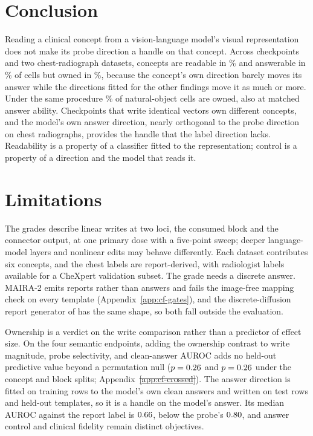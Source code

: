 \documentclass{article}
\makeatletter
\providecommand{\DIFaddtex}[1]{{\protect\color{blue}\uwave{#1}}} %
\providecommand{\DIFdeltex}[1]{{\protect\color{red}\sout{#1}}} %
\providecommand{\DIFaddbegin}{} %
\providecommand{\DIFaddend}{} %
\providecommand{\DIFdelbegin}{} %
\providecommand{\DIFdelend}{} %
\providecommand{\DIFadd}[1]{\texorpdfstring{\DIFaddtex{#1}}{#1}} %
\providecommand{\DIFdel}[1]{\texorpdfstring{\DIFdeltex{#1}}{}} %
\providecommand{\DIFscaledelfig}{0.5}
\newlength{\DIFdelgraphicswidth} %
\newlength{\DIFdelgraphicsheight} %
\providecommand{\DIFaddincludegraphics}[2][]{{\color{blue}\fbox{\DIFOincludegraphics[#1]{#2}}}} %
\providecommand{\DIFdelincludegraphics}[2][]{%
\sbox{\DIFdelgraphicsbox}{\DIFOincludegraphics[#1]{#2}}%
\settoboxwidth{\DIFdelgraphicswidth}{\DIFdelgraphicsbox} %
\settoboxtotalheight{\DIFdelgraphicsheight}{\DIFdelgraphicsbox} %
\scalebox{\DIFscaledelfig}{%
\parbox[b]{\DIFdelgraphicswidth}{\usebox{\DIFdelgraphicsbox}\\[-\baselineskip] \rule{\DIFdelgraphicswidth}{0em}}\llap{\resizebox{\DIFdelgraphicswidth}{\DIFdelgraphicsheight}{%
\setlength{\unitlength}{\DIFdelgraphicswidth}%
\begin{picture}(1,1)%
\thicklines\linethickness{2pt} %
{\color[rgb]{1,0,0}\put(0,0){\framebox(1,1){}}}%
{\color[rgb]{1,0,0}\put(0,0){\line( 1,1){1}}}%
{\color[rgb]{1,0,0}\put(0,1){\line(1,-1){1}}}%
\end{picture}%
}\hspace*{3pt}}} %
} %
\DeclareRobustCommand{\DIFaddbegin}{\DIFOaddbegin \let\includegraphics\DIFaddincludegraphics} %
\DeclareRobustCommand{\DIFaddend}{\DIFOaddend \let\includegraphics\DIFOincludegraphics} %
\DeclareRobustCommand{\DIFdelbegin}{\DIFOdelbegin \let\includegraphics\DIFdelincludegraphics} %
\DeclareRobustCommand{\DIFdelend}{\DIFOaddend \let\includegraphics\DIFOincludegraphics} %
\let\sout@orig\sout %
\renewcommand{\sout}[1]{\ifmmode\text{\sout@orig{\ensuremath{#1}}}\else\sout@orig{#1}\fi} %
\makeatother
\begin{document}
\section{Conclusion}
\label{sec:conclusion}

Reading a clinical concept from a vision-language model's visual representation does not make its probe direction a handle on that concept. Across \cfCheckpoints{} checkpoints and two chest-radiograph datasets, concepts are readable in \cfChestReadablePct\% and answerable in \cfChestAnswerablePct\% of cells but owned in \cfChestOwnedPct\%, because the concept's own direction barely moves its answer while the directions fitted for the other findings move it as much or more. Under the same procedure \cfCocoOwnedPct\% of natural-object cells are owned, also at matched answer ability. Checkpoints that write identical vectors own different concepts, and the model's own answer direction, nearly orthogonal to the probe direction on chest radiographs, provides the handle that the label direction lacks. Readability is a property of a classifier fitted to the representation; control is a property of a direction and the model that reads it.

\section{Limitations}
\label{sec:limitations}

The grades describe linear writes at two loci, the consumed block and the connector output, at one primary dose with a five-point sweep; deeper language-model layers and nonlinear edits may behave differently. Each dataset contributes six concepts, and the chest labels are report-derived, with radiologist labels available for a CheXpert validation subset. The grade needs a discrete answer. MAIRA-2 \citep{bannur2024maira} emits reports rather than answers and fails the image-free mapping check on every template (Appendix~\ref{app:cf-gates}), and the discrete-diffusion report generator of \citet{chen2026echo} has the same shape, so both fall outside the evaluation.

Ownership is a verdict on the write comparison rather than a predictor of effect size. On the four semantic endpoints, adding the ownership contrast to write magnitude, probe selectivity, and clean-answer AUROC adds no held-out predictive value beyond a permutation null ($p=0.26$ and $p=0.26$ under the concept and block splits; Appendix~\DIFdelbegin \DIFdel{\ref{app:cf-crossed}}\DIFdelend \DIFaddbegin \DIFadd{\ref{app:cf-ansdir}}\DIFaddend ). The answer direction is fitted on training rows to the model's own clean answers and written on test rows and held-out templates, so it is a handle on the model's answer. Its median AUROC against the report label is $0.66$, below the probe's $0.80$, and answer control and clinical fidelity remain distinct objectives.
\end{document}
